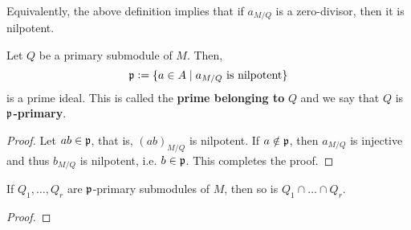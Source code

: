 Equivalently, the above definition implies that if $a_{M/Q}$ is a zero-divisor, then it is nilpotent.

\begin{proposition}
    Let $Q$ be a primary submodule of $M$. Then, 
    \begin{equation*}
        \mathfrak p := \{a\in A\mid a_{M/Q}\text{ is nilpotent}\}
    \end{equation*}
    is a prime ideal. This is called the \textbf{prime belonging to} $Q$ and we say that $Q$ is \textbf{$\mathfrak p$-primary}.
\end{proposition}
\begin{proof}
    Let $ab\in\mathfrak p$, that is, $(ab)_{M/Q}$ is nilpotent. If $a\notin\mathfrak p$, then $a_{M/Q}$ is injective and thus $b_{M/Q}$ is nilpotent, i.e. $b\in\mathfrak p$. This completes the proof.
\end{proof}

\begin{proposition}
    If $Q_1,\dots,Q_r$ are $\mathfrak p$-primary submodules of $M$, then so is $Q_1\cap\dots\cap Q_r$.
\end{proposition}
\begin{proof}
\end{proof}